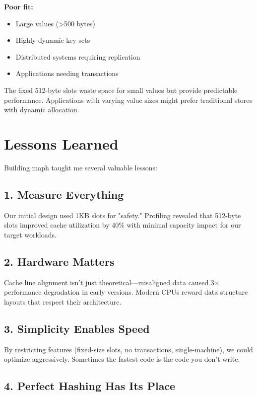 \documentclass[11pt]{article}
\begin{document}
\textbf{Poor fit:}
\begin{itemize}
\item Large values (>500 bytes)
\item Highly dynamic key sets
\item Distributed systems requiring replication
\item Applications needing transactions
\end{itemize}

The fixed 512-byte slots waste space for small values but provide predictable performance. Applications with varying value sizes might prefer traditional stores with dynamic allocation.

\section{Lessons Learned}

Building maph taught me several valuable lessons:

\subsection{1. Measure Everything}

Our initial design used 1KB slots for "safety." Profiling revealed that 512-byte slots improved cache utilization by 40\% with minimal capacity impact for our target workloads.

\subsection{2. Hardware Matters}

Cache line alignment isn't just theoretical—misaligned data caused 3× performance degradation in early versions. Modern CPUs reward data structure layouts that respect their architecture.

\subsection{3. Simplicity Enables Speed}

By restricting features (fixed-size slots, no transactions, single-machine), we could optimize aggressively. Sometimes the fastest code is the code you don't write.

\subsection{4. Perfect Hashing Has Its Place}
\end{document}
